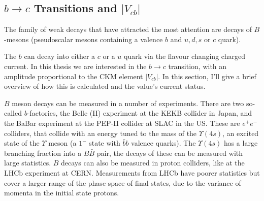 \subsection{$b\to c$ Transitions and $|V_{cb}|$}

The family of weak decays that have attracted the most attention are decays of $B$-mesons (pseudoscalar mesons containing a valence $b$ and $u,d,s$ or $c$ quark). %

The $b$ can decay into either a $c$ or a $u$ quark via the flavour changing charged current. In this thesis we are interested in the $b\to c$ transition, with an amplitude proportional to the CKM element $|V_{cb}|$. In this section, I'll give a brief overview of how this is calculated and the value's current status.

$B$ meson decays can be measured in a number of experiments. There are two so-called $b$-factories, the Belle (II) experiment at the KEKB collider in Japan, and the BaBar experiment at the PEP-II collider at SLAC in the US. These are $e^+e^-$ colliders, that collide with an energy tuned to the mass of the $\Upsilon(4s)$, an excited state of the $\Upsilon$ meson (a $1^-$ state with $\bar{b}b$ valence quarks). The $\Upsilon(4s)$ has a large branching fraction into a $B\bar{B}$ pair, the decays of these can be measured with large statistics. $B$ decays can also be measured in proton colliders, like at the LHCb experiment at CERN. Measurements from LHCb have poorer statistics but cover a larger range of the phase space of final states, due to the variance of momenta in the initial state protons.

